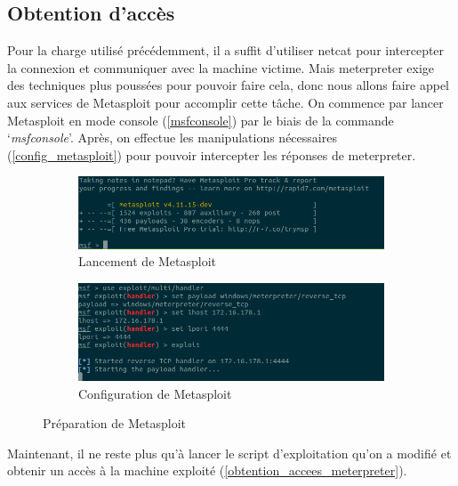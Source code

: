     \subsection{Obtention d'accès}
    Pour la charge utilisé précédemment, il a suffit d'utiliser netcat pour intercepter la connexion et communiquer
    avec la machine victime. Mais meterpreter exige des techniques plus poussées pour pouvoir faire cela, 
    donc nous allons faire appel aux services de Metasploit pour accomplir cette tâche.
    On commence par lancer Metasploit en mode console (\autoref{msfconsole}) par le biais de la commande 
    `\emph{msfconsole}'. Après, on effectue les manipulations nécessaires (\autoref{config_metasploit})
    pour pouvoir intercepter les réponses de meterpreter.

    \begin{figure}[h!t]
        \centering
        \begin{subfigure}{0.9\textwidth}
            \centering
            \includegraphics[width=\textwidth]{images/msfconsole.png}
            \caption{Lancement de Metasploit}
            \label{msfconsole}
        \end{subfigure}
        \hfill
        \begin{subfigure}{0.9\textwidth}
            \centering
            \includegraphics[width=\textwidth]{images/ecoute_msf.png}
            \caption{Configuration de Metasploit}
            \label{config_metasploit}
        \end{subfigure}
        \hfill
        \caption{Préparation de Metasploit}
        \label{exploitation_avec_charge_origine}
    \end{figure}

    Maintenant, il ne reste plus qu'à lancer le script d'exploitation qu'on a modifié et obtenir un accès à la 
    machine exploité (\autoref{obtention_accees_meterpreter}).

